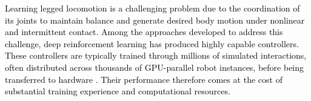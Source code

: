 \documentclass[a4paper, 10pt, conference]{ieeeconf}
\newcommand{\oldtext}[1]{\textcolor{red}{}}
\newcommand{\newtext}[1]{\textcolor{black}{#1}}
\begin{document}
\newtext{Learning legged locomotion is a challenging problem due to the coordination of its joints to maintain balance and generate desired body motion under
nonlinear and intermittent contact. Among the approaches developed to address
this challenge, deep reinforcement learning has produced highly capable
controllers. These controllers are typically trained through millions of
simulated interactions, often distributed across thousands of GPU-parallel robot
instances, before being transferred to hardware
\cite{hwangbo2019,lee2020,rudin2022,makoviychuk2021}. Their performance therefore
comes at the cost of substantial training experience and computational
resources.}

\end{document}
